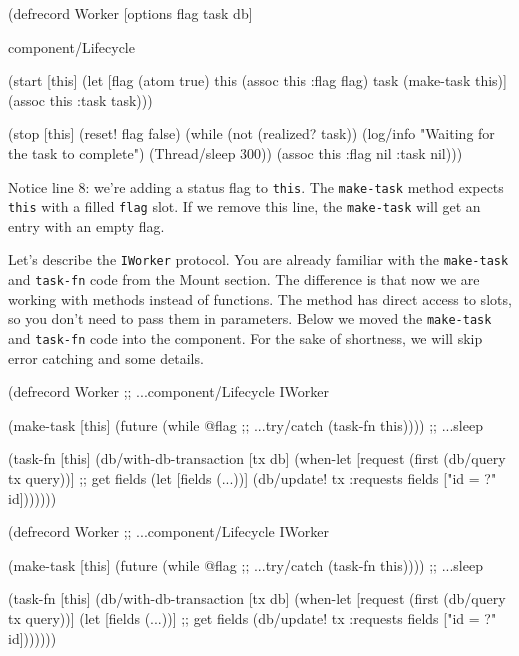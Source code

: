 \begin{english}
  \begin{clojure/lines}
(defrecord Worker
  [options flag task db]

  component/Lifecycle

  (start [this]
    (let [flag (atom true)
          this (assoc this :flag flag)
          task (make-task this)]
      (assoc this :task task)))

  (stop [this]
    (reset! flag false)
    (while (not (realized? task))
      (log/info "Waiting for the task to complete")
      (Thread/sleep 300))
    (assoc this :flag nil :task nil)))
  \end{clojure/lines}
\end{english}

\fi

Notice line 8: we're adding a status flag to \verb|this|. The \verb|make-task| method expects \verb|this| with a filled \verb|flag| slot. If we remove this line, the \verb|make-task| will get an entry with an empty flag.


Let's describe the \verb|IWorker| protocol. You are already familiar with the \verb|make-task| and \verb|task-fn| code from the Mount section. The difference is that now we are working with methods instead of functions. The method has direct access to slots, so you don't need to pass them in parameters. Below we moved the \verb|make-task| and \verb|task-fn| code into the component. For the sake of shortness, we will skip error catching and some details.

\ifnarrow

\begin{english}
  \begin{clojure}
(defrecord Worker
  ;; ...component/Lifecycle
  IWorker

  (make-task [this]
    (future
      (while @flag    ;; ...try/catch
        (task-fn this)))) ;; ...sleep

  (task-fn [this]
    (db/with-db-transaction [tx db]
      (when-let [request
                  (first
                    (db/query tx query))]
        ;; get fields
        (let [fields (...))]
          (db/update! tx :requests
            fields ["id = ?" id]))))))
  \end{clojure}
\end{english}

\else

\begin{english}
  \begin{clojure}
(defrecord Worker
  ;; ...component/Lifecycle
  IWorker

  (make-task [this]
    (future
      (while @flag        ;; ...try/catch
        (task-fn this)))) ;; ...sleep

  (task-fn [this]
    (db/with-db-transaction [tx db]
      (when-let [request (first (db/query tx query))]
        (let [fields (...))] ;; get fields
          (db/update! tx :requests
                      fields ["id = ?" id]))))))
  \end{clojure}
\end{english}

